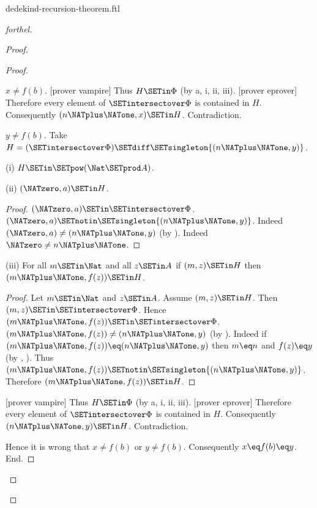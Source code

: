\documentclass{naproche-library}
\begin{document}
\begin{smodule}[title=Dedekind's Recursion Theorem]{dedekind-recursion-theorem.ftl}
\begin{proof}[forthel]
\begin{proof}
\begin{proof}
\begin{case}{$x \neq f(b)$.}
          [prover vampire]
          Thus $H \SETin \Phi$ (by a, i, ii, iii).
          [prover eprover]
          Therefore every element of $\SETintersectover \Phi$ is contained in $H$.
          Consequently $(n \NATplus \NATone,x) \SETin H$.
          Contradiction.
        \end{case}

        \begin{case}{$y \neq f(b)$.}
          Take $H = (\SETintersectover \Phi) \SETdiff \SETsingleton{(n \NATplus \NATone,y)}$.

          (i) $H \SETin \SETpow(\Nat \SETprod A)$.

          (ii) $(\NATzero,a) \SETin H$.
          \begin{proof}
            $(\NATzero,a) \SETin \SETintersectover \Phi$.
            $(\NATzero,a) \SETnotin \SETsingleton{(n \NATplus \NATone,y)}$.
            Indeed $(\NATzero,a) \neq (n \NATplus \NATone,y)$ (by ).
            Indeed $\NATzero \neq n \NATplus \NATone$.
          \end{proof}

          (iii) For all $m \SETin \Nat$ and all $z \SETin A$ if $(m,z) \SETin H$ then $(m \NATplus \NATone,f(z)) \SETin H$.
          \begin{proof}
            Let $m \SETin \Nat$ and $z \SETin A$.
            Assume $(m,z) \SETin H$.
            Then $(m,z) \SETin \SETintersectover \Phi$.
            Hence $(m \NATplus \NATone,f(z)) \SETin \SETintersectover \Phi$.
            $(m \NATplus \NATone,f(z)) \neq (n \NATplus \NATone,y)$ (by ).
            Indeed if $(m \NATplus \NATone,f(z)) \eq (n \NATplus \NATone,y)$ then $m \eq n$ and $f(z) \eq y$ (by , ).
            Thus $(m \NATplus \NATone,f(z)) \SETnotin \SETsingleton{(n \NATplus \NATone,y)}$.
            Therefore $(m \NATplus \NATone,f(z)) \SETin H$.
          \end{proof}

          [prover vampire]
          Thus $H \SETin \Phi$ (by a, i, ii, iii).
          [prover eprover]
          Therefore every element of $\SETintersectover \Phi$ is contained in $H$.
          Consequently $(n \NATplus \NATone,y) \SETin H$.
          Contradiction.
        \end{case}

        Hence it is wrong that $x \neq f(b)$ or $y \neq f(b)$.
        Consequently $x \eq f(b) \eq y$.
      End.


\end{proof}
\end{proof}
\end{proof}
\end{smodule}
\end{document}
